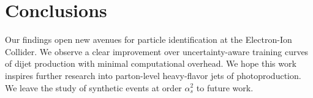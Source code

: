 \section{Conclusions}\label{sec:conclusions}

Our findings open new avenues for particle identification at the
Electron-Ion Collider. We observe a clear improvement over
uncertainty-aware training curves of dijet production with minimal
computational overhead. We hope this work inspires further research into
parton-level heavy-flavor jets of photoproduction. We leave the study of
synthetic events at order $\alpha_s^2$ to future work.

